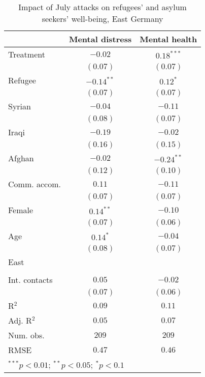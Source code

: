 
\begin{table}
\caption{Impact of July attacks on refugees' and asylum seekers' well-being, East Germany}
\begin{center}
\begin{tabular}{l c c}
\toprule
 & Mental distress & Mental health \\
\midrule
Treatment     & $-0.02$      & $0.18^{***}$ \\
              & $(0.07)$     & $(0.07)$     \\
Refugee       & $-0.14^{**}$ & $0.12^{*}$   \\
              & $(0.07)$     & $(0.07)$     \\
Syrian        & $-0.04$      & $-0.11$      \\
              & $(0.08)$     & $(0.07)$     \\
Iraqi         & $-0.19$      & $-0.02$      \\
              & $(0.16)$     & $(0.15)$     \\
Afghan        & $-0.02$      & $-0.24^{**}$ \\
              & $(0.12)$     & $(0.10)$     \\
Comm. accom.  & $0.11$       & $-0.11$      \\
              & $(0.07)$     & $(0.07)$     \\
Female        & $0.14^{**}$  & $-0.10$      \\
              & $(0.07)$     & $(0.06)$     \\
Age           & $0.14^{*}$   & $-0.04$      \\
              & $(0.08)$     & $(0.07)$     \\
East          &              &              \\
              &              &              \\
Int. contacts & $0.05$       & $-0.02$      \\
              & $(0.07)$     & $(0.06)$     \\
\midrule
R$^2$         & $0.09$       & $0.11$       \\
Adj. R$^2$    & $0.05$       & $0.07$       \\
Num. obs.     & $209$        & $209$        \\
RMSE          & $0.47$       & $0.46$       \\
\bottomrule
\multicolumn{3}{l}{\scriptsize{$^{***}p<0.01$; $^{**}p<0.05$; $^{*}p<0.1$}}
\end{tabular}
\label{tab_mhealth_east}
\end{center}
\end{table}
